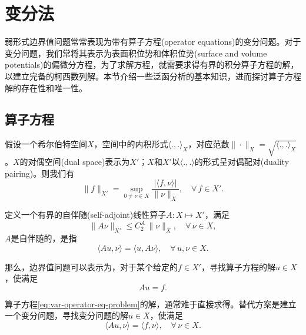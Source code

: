 \section{变分法}
\label{sec:variational-methods}
弱形式边界值问题常常表现为带有算子方程(operator equations)的变分问题。对于变分问题，我们常将其表示为表面积位势和体积位势(surface and volume potentials)的偏微分方程，为了求解方程，就需要求得有界的积分算子方程的解，以建立完备的柯西数列解。本节介绍一些泛函分析的基本知识，进而探讨算子方程解的存在性和唯一性。

\subsection{算子方程}
\label{sec:variational-operator-equations}

假设一个希尔伯特空间$X$，空间中的内积形式$\langle .,.\rangle_{X}$，对应范数$\| \cdot \|_{X} = \sqrt{\langle .,.\rangle_{X}}$。$X$的对偶空间(dual space)表示为$X'$；$X$和$X'$以$\langle .,. \rangle$的形式呈对偶配对(duality pairing)。则我们有
\begin{equation}
  \label{eq:var-operator-norm}
  \big\| f \big\|_{X'} = \sup_{0 \neq \nu \in X}
  \frac{
  \big| \langle f,\nu \rangle \big|
  }{\| \nu \|_{X}}, \quad \forall \, f \in X'.
\end{equation}

定义一个有界的自伴随(self-adjoint)线性算子$A:X \mapsto X'$，满足
\begin{equation}
  \label{eq:var-operator-equation}
  \big\| A \nu \big\|_{X'} \le C_2^A \, \| \nu \|_{X}, \quad \forall \, \nu \in X,
\end{equation}
$A$是自伴随的，是指
\begin{equation}
  \label{eq:var-operator-self-adjoint}
  \langle A u, \nu \rangle = \langle  u, A \nu \rangle, \quad \forall \, u, \nu \in X.
\end{equation}

那么，边界值问题可以表示为，对于某个给定的$f \in X'$，寻找算子方程的解$u \in X$，使满足
\begin{equation}
  \label{eq:var-operator-eq-problem}
  A u = f.
\end{equation}

算子方程\eqref{eq:var-operator-eq-problem}的解，通常难于直接求得。替代方案是建立一个变分问题，寻找变分问题的解$u \in X$，使满足
\begin{equation}
  \label{eq:var-operator-var-problem}
  \langle Au,\nu \rangle = \langle f, \nu \rangle, \quad \forall \, \nu \in X.
\end{equation}

